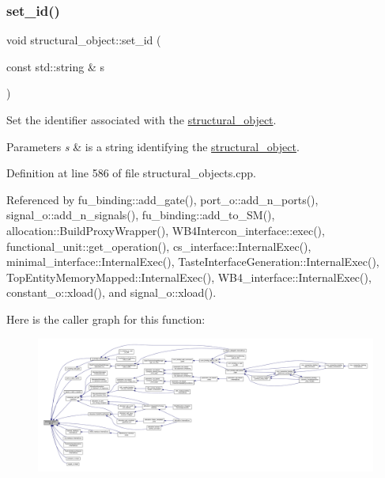 \subsubsection{\texorpdfstring{set\+\_\+id()}{set\_id()}}
{\footnotesize\ttfamily void structural\+\_\+object\+::set\+\_\+id (\begin{DoxyParamCaption}\item[{const std\+::string \&}]{s }\end{DoxyParamCaption})}



Set the identifier associated with the \hyperlink{classstructural__object}{structural\+\_\+object}. 


\begin{DoxyParams}{Parameters}
{\em s} & is a string identifying the \hyperlink{classstructural__object}{structural\+\_\+object}. \\
\hline
\end{DoxyParams}


Definition at line 586 of file structural\+\_\+objects.\+cpp.



Referenced by fu\+\_\+binding\+::add\+\_\+gate(), port\+\_\+o\+::add\+\_\+n\+\_\+ports(), signal\+\_\+o\+::add\+\_\+n\+\_\+signals(), fu\+\_\+binding\+::add\+\_\+to\+\_\+\+S\+M(), allocation\+::\+Build\+Proxy\+Wrapper(), W\+B4\+Intercon\+\_\+interface\+::exec(), functional\+\_\+unit\+::get\+\_\+operation(), cs\+\_\+interface\+::\+Internal\+Exec(), minimal\+\_\+interface\+::\+Internal\+Exec(), Taste\+Interface\+Generation\+::\+Internal\+Exec(), Top\+Entity\+Memory\+Mapped\+::\+Internal\+Exec(), W\+B4\+\_\+interface\+::\+Internal\+Exec(), constant\+\_\+o\+::xload(), and signal\+\_\+o\+::xload().

Here is the caller graph for this function\+:
\nopagebreak
\begin{figure}[H]
\begin{center}
\leavevmode
\includegraphics[width=350pt]{d8/da3/classstructural__object_a9f0eed2702c3b6d4ae0931eee452ec6a_icgraph}
\end{center}
\end{figure}
\mbox{\label{classstructural__object_a6baefd335d65ccf273b2bf3cf660cd90}} 
